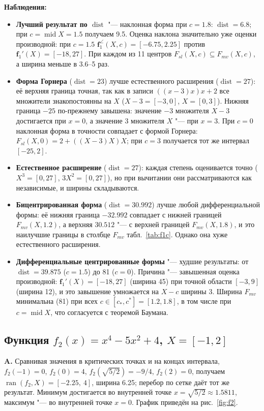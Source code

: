 \documentclass[12pt,a4paper]{article}
\newcommand{\ran}{\operatorname{ran}}
\newcommand{\Mid}{\operatorname{mid}}
\newcommand{\dist}{\operatorname{dist}}
\newcommand{\bff}{\mathbf{f}}
\begin{document}
\textbf{Наблюдения:}
\begin{itemize}
\item \textbf{Лучший результат по $\dist$} "--- наклонная форма при $c=1.8$: $\dist=6.8$; при $c=\Mid X=1.5$ получаем 9.5. Оценка наклона значительно уже оценки производной: при $c=1.5$ $\bff_1^{\angle}(X,c)=[-6.75,2.25]$ против $\bff_1'(X)=[-18,27]$. При каждом из 11 центров $F_{sl}(X,c)\subseteq F_{mv}(X,c)$, а ширина меньше в 3.6--5 раз.
\item \textbf{Форма Горнера} ($\dist=23$) лучше естественного расширения ($\dist=27$): её верхняя граница точная, так как в записи $((x-3)x)x+2$ все множители знакопостоянны на $X$ ($X-3=[-3,0]$, $X=[0,3]$). Нижняя граница $-25$ по-прежнему завышена: значение $-3$ множителя $X-3$ достигается при $x=0$, а значение 3 множителя $X$ "--- при $x=3$. При $c=0$ наклонная форма в точности совпадает с формой Горнера: $F_{sl}(X,0)=2+((X-3)X)X$; при $c=3$ получается тот же интервал $[-25,2]$.
\item \textbf{Естественное расширение} ($\dist=27$): каждая степень оценивается точно ($X^3=[0,27]$, $3X^2=[0,27]$), но при вычитании они рассматриваются как независимые, и ширины складываются.
\item \textbf{Бицентрированная форма} ($\dist=30.992$) лучше любой дифференциальной формы: её нижняя граница $-32.992$ совпадает с нижней границей $F_{mv}(X,1.2)$, а верхняя $30.512$ "--- с верхней границей $F_{mv}(X,1.8)$, и это наилучшие границы в столбце $F_{mv}$ табл.~\ref{tab:f1c}. Однако она хуже естественного расширения.
\item \textbf{Дифференциальные центрированные формы} "--- худшие результаты: от $\dist=39.875$ ($c=1.5$) до 81 ($c=0$). Причина "--- завышенная оценка производной: $\bff_1'(X)=[-18,27]$ (ширина 45) при точной области $[-3,9]$ (ширина 12), и это завышение умножается на $X-c$ ширины 3. Ширина $F_{mv}$ минимальна (81) при всех $c\in[c_{*},c^{*}]=[1.2,1.8]$, в том числе при $c=\Mid X$, что согласуется с теоремой Баумана.
\end{itemize}

\subsection*{Функция $f_2(x)=x^4-5x^2+4$, $X=[-1,2]$}

\textbf{A.} Сравнивая значения в критических точках и на концах интервала, $f_2(-1)=0$, $f_2(0)=4$, $f_2(\sqrt{5/2})=-9/4$, $f_2(2)=0$, получаем $\ran(f_2,X)=[-2.25,\ 4]$, ширина 6.25; перебор по сетке даёт тот же результат. Минимум достигается во внутренней точке $x=\sqrt{5/2}\approx1.5811$, максимум "--- во внутренней точке $x=0$. График приведён на рис.~\ref{fig:f2}.
\end{document}
